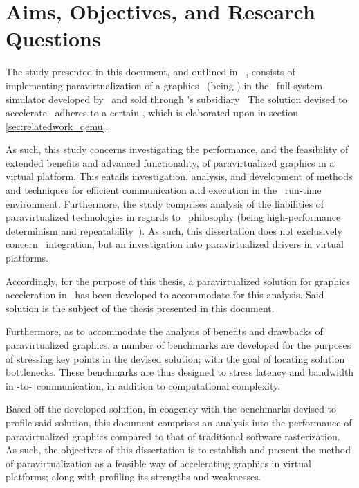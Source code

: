 
\chapter{Aims, Objectives, and Research Questions}
\label{cha:aimsandobjectives}
The study presented in this document, and outlined in ~, consists of implementing paravirtualization of a graphics \dvttermapi\ (being \dvttermopenglestwopointo ) in the \dvttermsimics\ full-system simulator developed by \dvttermintel\ and sold through \dvttermintel 's subsidiary \dvttermwindriver\ 
The solution devised to accelerate \dvttermopengl\ adheres to a certain \dvttermreferencesolution , which is elaborated upon in section \ref{sec:relatedwork_qemu}.

As such, this study concerns investigating the performance, and the feasibility of extended benefits and advanced functionality, of paravirtualized graphics in a virtual platform.
This entails investigation, analysis, and development of methods and techniques for efficient communication and execution in the \dvttermsimics\ run-time environment.
Furthermore, the study comprises analysis of the liabilities of paravirtualized technologies in regards to \dvttermsimics\ philosophy (being high-performance determinism and repeatability~).
As such, this dissertation does not exclusively concern \dvttermsimics\ integration, but an investigation into paravirtualized drivers in virtual platforms.

Accordingly, for the purpose of this thesis, a paravirtualized solution for graphics acceleration in \dvttermsimics\ has been developed to accommodate for this analysis.
Said solution is the subject of the thesis presented in this document.

Furthermore, as to accommodate the analysis of benefits and drawbacks of paravirtualized graphics, a number of benchmarks are developed for the purposes of stressing key points in the devised solution; with the goal of locating solution bottlenecks.
These benchmarks are thus designed to stress latency and bandwidth in \dvttermtarget -to-\dvttermhost\ communication, in addition to computational complexity.

Based off the developed solution, in coagency with the benchmarks devised to profile said solution, this document comprises an analysis into the performance of paravirtualized graphics compared to that of traditional software rasterization.
As such, the objectives of this dissertation is to establish and present the method of paravirtualization as a feasible way of accelerating graphics in virtual platforms; along with profiling its strengths and weaknesses.\\

